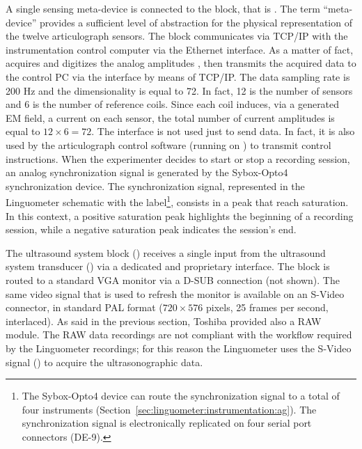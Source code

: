 A single sensing meta-device is connected to the  block, that is
.
The term ``meta-device'' provides a sufficient level of abstraction for the
physical representation of the twelve articulograph sensors.
The  block communicates via TCP/IP with the instrumentation control
computer  via the  Ethernet interface.
As a matter of fact,  acquires and digitizes the analog amplitudes
, then transmits the acquired data to the control PC via the 
 interface by means of TCP/IP.
The  data sampling rate is 200 Hz and the dimensionality is equal to 
72. In fact, 12 is the number of sensors and 6 is the number of reference coils.
Since each coil induces, via a generated EM field, a current on each sensor, the
total number of current amplitudes is equal to $12\times6 = 72$.
The  interface is not used just to send data. 
In fact, it is also used by
the articulograph control software (running on ) to transmit
control instructions.
When the experimenter decides to start or stop a recording session, an analog 
synchronization signal is generated by the Sybox-Opto4 synchronization device.
The synchronization signal, represented in the Linguometer schematic with
the  label\footnote{The Sybox-Opto4 device can route the
synchronization signal to a total of four instruments 
(Section~\ref{sec:linguometer:instrumentation:ag}). The synchronization
signal is electronically replicated on four serial port connectors (DE-9).}, 
consists in a peak that reach saturation. In this context, a positive saturation
peak highlights the beginning of a recording session, while a negative
saturation peak indicates the session's end.

The ultrasound system block () receives a single input from the
ultrasound system transducer () via a dedicated and proprietary
interface. The  block is routed to a standard VGA monitor via a D-SUB
connection (not shown). 
The same video signal that is used to refresh the monitor is available on
an S-Video connector, in standard PAL format ($720\times576$ pixels, 25 frames
per second, interlaced).
As said in the previous section, Toshiba provided also a RAW module. 
The RAW data recordings are not compliant with the workflow required by the
Linguometer recordings; for this reason the Linguometer uses the S-Video
signal () to acquire the 
ultrasonographic data.

